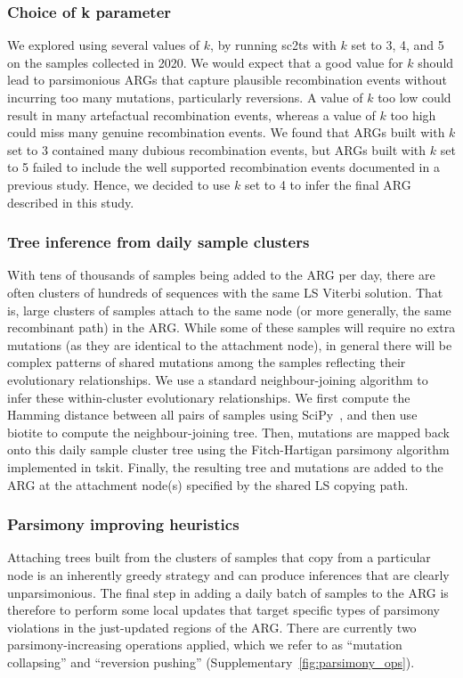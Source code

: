 \documentclass[12pt]{article}
\newcommand{\siref}[1]{Supplementary~\ref{#1}}
\begin{document}
\subsubsection*{Choice of k parameter}

We explored using several values of $k$,
by running sc2ts with $k$ set to 3, 4, and 5
on the samples collected in 2020.
We would expect that a good value for $k$
should lead to parsimonious ARGs
that capture plausible recombination events
without incurring too many mutations, particularly reversions.
A value of $k$ too low could result in many artefactual recombination events,
whereas a value of $k$ too high could miss many genuine recombination events.
We found that ARGs built with $k$ set to 3
contained many dubious recombination events,
but ARGs built with $k$ set to 5 failed
to include the well supported recombination events documented
in a previous study\cite{Jackson2021}.
Hence, we decided to use $k$ set to 4
to infer the final ARG described in this study.

\subsubsection*{Tree inference from daily sample clusters}
With tens of thousands of samples being added to the ARG per day,
there are often clusters of hundreds of sequences with the same
LS Viterbi solution. That is, large clusters of samples attach
to the same node (or more generally, the same recombinant path)
in the ARG. While some of these samples will require no extra mutations
(as they are identical to the attachment node),
in general there will be complex patterns of shared mutations among the samples
reflecting their evolutionary relationships.
We use a standard neighbour-joining algorithm\cite{Saitou1987}
to infer these within-cluster evolutionary relationships.
We first compute the Hamming distance between
all pairs of samples using SciPy~\cite{Virtanen2020scipy},
and then use biotite\cite{Kunzmann2018biotite,Kunzmann2023biotite}
to compute the neighbour-joining tree.
Then, mutations are mapped back onto this daily sample cluster tree using
the Fitch-Hartigan parsimony
algorithm\cite{Fitch1971toward,Hartigan1973minimum} implemented in tskit.
Finally, the resulting tree and mutations are added to the ARG at the attachment node(s)
specified by the shared LS copying path.

\subsubsection*{Parsimony improving heuristics}
Attaching trees built from the clusters of samples that copy from
a particular node is an inherently greedy strategy
and can produce inferences that are clearly unparsimonious.
The final step in adding a daily batch of samples to the ARG
is therefore to perform some local updates that target specific
types of parsimony violations in the just-updated regions of the
ARG. There are currently two parsimony-increasing operations
applied, which we refer to as ``mutation collapsing'' and ``reversion
pushing'' (\siref{fig:parsimony_ops}).
\end{document}
